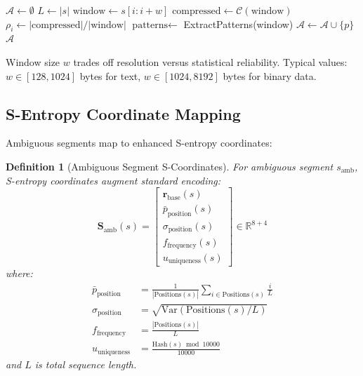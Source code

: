 \documentclass[12pt,a4paper]{article}
\newtheorem{definition}{Definition}
\begin{document}
\begin{algorithm}[H]
\caption{Sliding Window Compression Analysis}
\begin{algorithmic}[1]
\State $\mathcal{A} \leftarrow \emptyset$ 
\State $L \leftarrow |s|$ 
 
    \State $\text{window} \leftarrow s[i:i+w]$
    \State $\text{compressed} \leftarrow \mathcal{C}(\text{window})$
    \State $\rho_i \leftarrow |\text{compressed}|/|\text{window}|$
     
        \State $\text{patterns} \leftarrow$ ExtractPatterns(window)
             
                \State $\mathcal{A} \leftarrow \mathcal{A} \cup \{p\}$
            \EndIf
        \EndFor
    \EndIf
\EndFor
\State \Return $\mathcal{A}$ 
\EndProcedure
\end{algorithmic}
\end{algorithm}

Window size $w$ trades off resolution versus statistical reliability. Typical values: $w \in [128, 1024]$ bytes for text, $w \in [1024, 8192]$ bytes for binary data.

\subsection{S-Entropy Coordinate Mapping}

Ambiguous segments map to enhanced S-entropy coordinates:

\begin{definition}[Ambiguous Segment S-Coordinates]
For ambiguous segment $s_{\text{amb}}$, S-entropy coordinates augment standard encoding:
\begin{equation}
\mathbf{S}_{\text{amb}}(s) = \begin{bmatrix}
\mathbf{r}_{\text{base}}(s) \\
\bar{p}_{\text{position}}(s) \\
\sigma_{\text{position}}(s) \\
f_{\text{frequency}}(s) \\
u_{\text{uniqueness}}(s)
\end{bmatrix} \in \mathbb{R}^{8+4}
\end{equation}
where:
\begin{align}
\bar{p}_{\text{position}} &= \frac{1}{|\text{Positions}(s)|} \sum_{i \in \text{Positions}(s)} \frac{i}{L} \\
\sigma_{\text{position}} &= \sqrt{\text{Var}(\text{Positions}(s)/L)} \\
f_{\text{frequency}} &= \frac{|\text{Positions}(s)|}{L} \\
u_{\text{uniqueness}} &= \frac{\text{Hash}(s) \bmod 10000}{10000}
\end{align}
and $L$ is total sequence length.
\end{definition}
\end{document}

